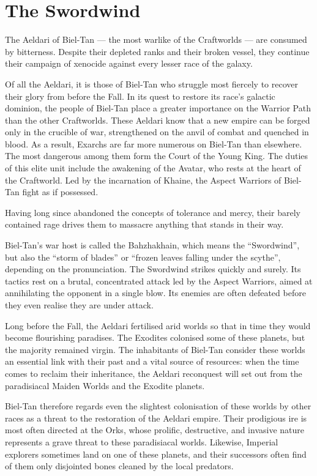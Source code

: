 \section{The Swordwind}

The Aeldari of Biel-Tan --- the most warlike of the Craftworlds --- are consumed by bitterness. Despite their depleted ranks and their broken vessel, they continue their campaign of xenocide against every lesser race of the galaxy.

Of all the Aeldari, it is those of Biel-Tan who struggle most fiercely to recover their glory from before the Fall. In its quest to restore its race's galactic dominion, the people of Biel-Tan place a greater importance on the Warrior Path than the other Craftworlds. These Aeldari know that a new empire can be forged only in the crucible of war, strengthened on the anvil of combat and quenched in blood. As a result, Exarchs are far more numerous on Biel-Tan than elsewhere. The most dangerous among them form the Court of the Young King. The duties of this elite unit include the awakening of the Avatar, who rests at the heart of the Craftworld. Led by the incarnation of Khaine, the Aspect Warriors of Biel-Tan fight as if possessed.

Having long since abandoned the concepts of tolerance and mercy, their barely contained rage drives them to massacre anything that stands in their way.

Biel-Tan's war host is called the Bahzhakhain, which means the ``Swordwind'', but also the ``storm of blades'' or ``frozen leaves falling under the scythe'', depending on the pronunciation. The Swordwind strikes quickly and surely. Its tactics rest on a brutal, concentrated attack led by the Aspect Warriors, aimed at annihilating the opponent in a single blow. Its enemies are often defeated before they even realise they are under attack.

Long before the Fall, the Aeldari fertilised arid worlds so that in time they would become flourishing paradises. The Exodites colonised some of these planets, but the majority remained virgin. The inhabitants of Biel-Tan consider these worlds an essential link with their past and a vital source of resources: when the time comes to reclaim their inheritance, the Aeldari reconquest will set out from the paradisiacal Maiden Worlds and the Exodite planets.

Biel-Tan therefore regards even the slightest colonisation of these worlds by other races as a threat to the restoration of the Aeldari empire. Their prodigious ire is most often directed at the Orks, whose prolific, destructive, and invasive nature represents a grave threat to these paradisiacal worlds. Likewise, Imperial explorers sometimes land on one of these planets, and their successors often find of them only disjointed bones cleaned by the local predators.


